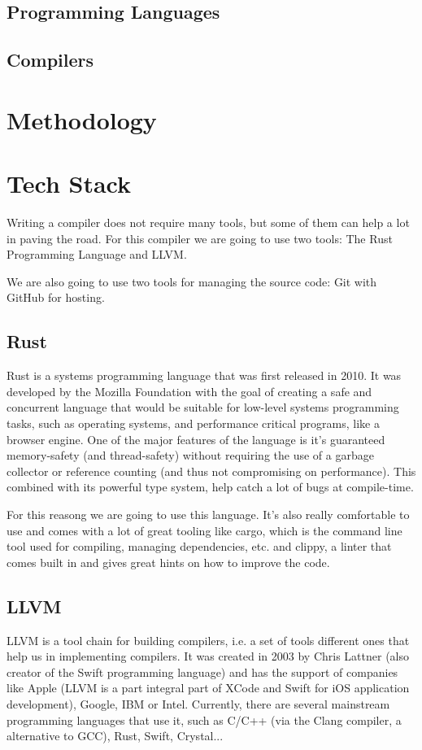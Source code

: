 ﻿\documentclass[10pt,a4paper,twocolumn,twoside]{article}
\begin{document}
\subsection{Programming Languages}
\subsection{Compilers}

\section{Methodology}

\section{Tech Stack}

Writing a compiler does not require many tools, but some of them can help a lot
in paving the road. For this compiler we are going to use two tools: 
The Rust Programming Language and LLVM.

We are also going to use two tools for managing the source code: Git with GitHub
for hosting.

\subsection{Rust}
Rust is a systems programming language that was first released in 2010. It was
developed by the Mozilla Foundation with the goal of creating a safe and
concurrent language that would be suitable for low-level systems programming
tasks, such as operating systems, and performance critical programs, like a
browser engine. One of the major features of the language is it's guaranteed
memory-safety (and thread-safety) without requiring the use of a garbage
collector or reference counting (and thus not compromising on performance).
This combined with its powerful type system, help catch a lot of bugs at 
compile-time.

For this reasong we are going to use this language. It's also really comfortable
to use and comes with a lot of great tooling like cargo, which is the command 
line tool used for compiling, managing dependencies, etc. and clippy, a linter
that comes built in and gives great hints on how to improve the code.

\subsection{LLVM}
LLVM is a tool chain for building compilers, i.e. a set of tools different ones
that help us in implementing compilers. It was created in 2003 by Chris Lattner
(also creator of the Swift programming language) and has the support of
companies like Apple (LLVM is a part integral part of XCode and Swift for iOS
application development), Google, IBM or Intel. Currently, there are several
mainstream programming languages that use it, such as C/C++ (via the Clang
compiler, a alternative to GCC), Rust, Swift, Crystal...
\end{document}
